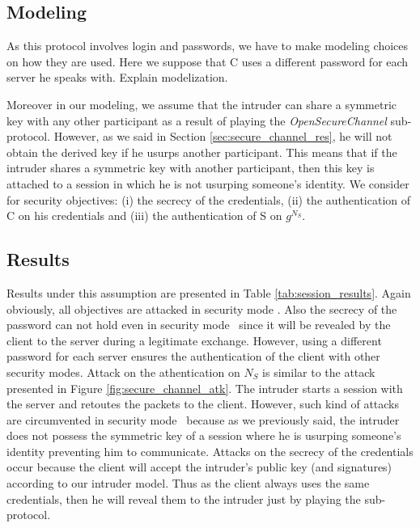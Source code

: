 \subsection{Modeling}

As this protocol involves login and passwords, we have to make modeling choices
on how they are used.
Here we suppose that C uses a different password for each server he speaks with.
\TODO Explain modelization.

Moreover in our modeling, we assume that the intruder can share a symmetric key
with any other participant as a result of playing the {\em OpenSecureChannel}
sub-protocol.
However, as we said in Section \ref{sec:secure_channel_res}, he will not obtain
the derived key if he usurps another participant.
This means that if the intruder shares a symmetric key with another participant,
then this key is attached to a session in which he is not usurping someone's
identity.
We consider for security objectives: (i) the secrecy of the credentials, (ii)
the authentication of C on his credentials and (iii) the authentication of S on
$g^{N_{S}}$.

\subsection{Results}

Results under this assumption are presented in Table \ref{tab:session_results}.
Again obviously, all objectives are attacked in security mode \smn.
Also the secrecy of the password can not hold even in security mode \sms~since
it will be revealed by the client to the server during a legitimate exchange.
However, using a different password for each server ensures the authentication
of the client with other security modes.
Attack on the athentication on $N_{S}$ is similar to the attack presented in
Figure \ref{fig:secure_channel_atk}.
The intruder starts a session with the server and retoutes the packets to the
client.
However, such kind of attacks are circumvented in security mode \smse~because
as we previously said, the intruder does not possess the symmetric key of a
session where he is usurping someone's identity preventing him to communicate.
Attacks on the secrecy of the credentials occur because the client will accept
the intruder's public key (and signatures) according to our intruder model.
Thus as the client always uses the same credentials, then he will reveal them to
the intruder just by playing the sub-protocol.

